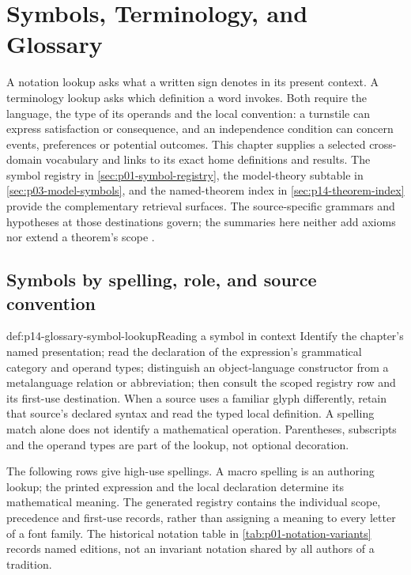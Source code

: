 \chapter{Symbols, Terminology, and Glossary}
\label{sec:p14-symbols-terminology-and-glossary}

A notation lookup asks what a written sign denotes in its present context.
A terminology lookup asks which definition a word invokes. Both require the
language, the type of its operands and the local convention: a turnstile can
express satisfaction or consequence, and an independence condition can concern
events, preferences or potential outcomes. This chapter supplies a selected
cross-domain vocabulary and links to its exact home definitions and results.
The symbol registry in \cref{sec:p01-symbol-registry}, the model-theory
subtable in \cref{sec:p03-model-symbols}, and the named-theorem index in
\cref{sec:p14-theorem-index} provide the complementary retrieval surfaces.
The source-specific grammars and hypotheses at those destinations govern;
the summaries here neither add axioms nor extend a theorem's scope
\cite{Enderton2001,HalpernUncertaintyChapter2Extract,Pearl2009CausalOverview,
Rubinstein2015LectureNotes}.

\section{Symbols by spelling, role, and source convention}
\label{sec:p14-glossary-symbols}

\begin{hbmethod}{def:p14-glossary-symbol-lookup}{Reading a symbol in context}
Identify the chapter's named presentation; read the declaration of the
expression's grammatical category and operand types; distinguish an
object-language constructor from a metalanguage relation or abbreviation;
then consult the scoped registry row and its first-use destination. When a
source uses a familiar glyph differently, retain that source's declared
syntax and read the typed local definition. A spelling match alone does not
identify a mathematical operation. Parentheses, subscripts and the operand
types are part of the lookup, not optional decoration.
\end{hbmethod}

The following rows give high-use spellings. A macro spelling is an authoring
lookup; the printed expression and the local declaration determine its
mathematical meaning. The generated registry contains the individual scope,
precedence and first-use records, rather than assigning a meaning to every
letter of a font family. The historical notation table in
\cref{tab:p01-notation-variants} records named editions, not an invariant
notation shared by all authors of a tradition.

